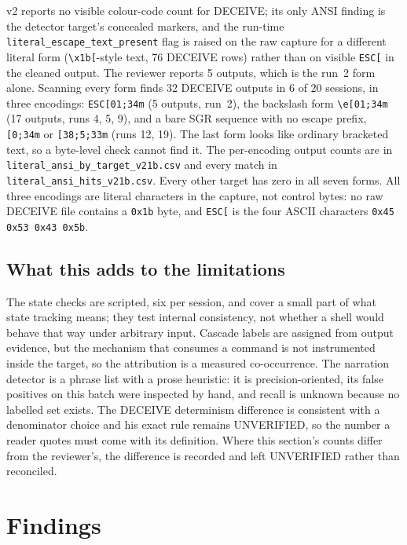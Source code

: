 \documentclass[a4paper,11pt]{article}
\begin{document}
v2 reports no visible colour-code count for DECEIVE; its only ANSI finding is
the detector target's concealed markers, and the run-time
\texttt{literal\_escape\_text\_present} flag is raised on the raw capture for a
different literal form (\texttt{\textbackslash x1b[}-style text, 76 DECEIVE
rows) rather than on visible \texttt{ESC[} in the cleaned output. The reviewer
reports 5 outputs, which is the run~2 form alone. Scanning every form finds 32
DECEIVE outputs in 6 of 20 sessions, in three encodings: \texttt{ESC[01;34m}
(5 outputs, run~2), the backslash form \texttt{\textbackslash e[01;34m}
(17 outputs, runs 4, 5, 9), and a bare SGR sequence with no escape prefix, \texttt{[0;34m} or
\texttt{[38;5;33m} (runs 12, 19). The last form looks like ordinary bracketed
text, so a byte-level check cannot find it. The per-encoding output counts are in \texttt{literal\_ansi\_by\_target\_v21b.csv} and every match in \texttt{literal\_ansi\_hits\_v21b.csv}. Every other target has zero in all
seven forms. All three encodings are literal characters in the capture, not
control bytes: no raw DECEIVE file contains a \texttt{0x1b} byte, and
\texttt{ESC[} is the four ASCII characters \texttt{0x45 0x53 0x43 0x5b}.

\subsection{What this adds to the limitations}
\label{sec:v21-limits}

The state checks are scripted, six per session, and cover a small part of what
state tracking means; they test internal consistency, not whether a shell would
behave that way under arbitrary input. Cascade labels are assigned from output
evidence, but the mechanism that consumes a command is not instrumented inside
the target, so the attribution is a measured co-occurrence. The narration
detector is a phrase list with a prose heuristic: it is precision-oriented, its
false positives on this batch were inspected by hand, and recall is unknown
because no labelled set exists. The DECEIVE determinism difference is
consistent with a denominator choice and his exact rule remains UNVERIFIED, so
the number a reader quotes must come with its definition.
Where this section's counts differ from the reviewer's, the difference is
recorded and left UNVERIFIED rather than reconciled.

\section{Findings}
\end{document}
